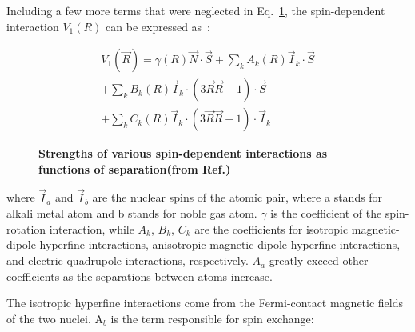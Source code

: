 Including a few more terms that were neglected in Eq.~\ref{V1}, the spin-dependent interaction $V_{1}(R)$ can be expressed as~\cite{WalkerHapper}:

\begin{equation}
\begin{split}
V_{1}(\vec{R})=\gamma(R)\vec{N}\cdot \vec{S}+\sum_{k}A_{k}(R)\vec{I}_{k}\cdot \vec{S}\\
+\sum_{k}B_{k}(R)\vec{I}_{k}\cdot (3\vec{R}\vec{R}-1)\cdot \vec{S}\\
+\sum_{k}C_{k}(R)\vec{I}_{k}\cdot (3\vec{R}\vec{R}-1)\cdot \vec{I}_{k}
\end{split}
\end{equation}

\begin{figure}[H]
	\centering
	\caption{{\bf Strengths of various spin-dependent interactions as functions of separation(from Ref.\@ \cite{WalkerHapper})}}
	\label{V1}
\end{figure}
where $\vec{I}_{a}$ and $\vec{I}_{b}$ are the nuclear spins of the atomic pair, where a stands for alkali metal atom and b stands for noble gas atom. $\gamma$ is the coefficient of the spin-rotation interaction, while $A_{k}$, $B_{k}$, $C_{k}$ are the coefficients for isotropic magnetic-dipole hyperfine interactions, anisotropic magnetic-dipole hyperfine interactions, and electric quadrupole interactions, respectively. $A_{a}$ greatly exceed other coefficients as the separations between atoms increase. 

The isotropic hyperfine interactions come from the Fermi-contact magnetic fields of the two nuclei. A$_{b}$ is the term responsible for spin exchange:

